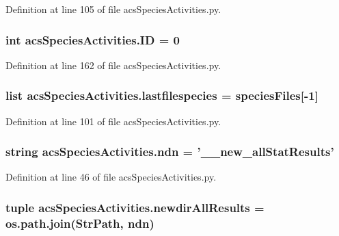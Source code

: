 Definition at line 105 of file acs\-Species\-Activities.\-py.

\hypertarget{a00103_a8102909ea2c113190493bd581f17ba18}{
\subsubsection[{I\-D}]{\setlength{\rightskip}{0pt plus 5cm}int acs\-Species\-Activities.\-I\-D = 0}}\label{a00103_a8102909ea2c113190493bd581f17ba18}


Definition at line 162 of file acs\-Species\-Activities.\-py.

\hypertarget{a00103_ac7070acb2aaeb8965c57e81b6308ddd5}{
\subsubsection[{lastfilespecies}]{\setlength{\rightskip}{0pt plus 5cm}list acs\-Species\-Activities.\-lastfilespecies = {\bf species\-Files}\mbox{[}-\/1\mbox{]}}}\label{a00103_ac7070acb2aaeb8965c57e81b6308ddd5}


Definition at line 101 of file acs\-Species\-Activities.\-py.

\hypertarget{a00103_ad2a87ed28d0f42525ce49c390f390298}{
\subsubsection[{ndn}]{\setlength{\rightskip}{0pt plus 5cm}string acs\-Species\-Activities.\-ndn = '\-\_\-\_\-new\-\_\-all\-Stat\-Results'}}\label{a00103_ad2a87ed28d0f42525ce49c390f390298}


Definition at line 46 of file acs\-Species\-Activities.\-py.

\hypertarget{a00103_a4fc28291b7f61ee2fa8969fa7a690ba2}{
\subsubsection[{newdir\-All\-Results}]{\setlength{\rightskip}{0pt plus 5cm}tuple acs\-Species\-Activities.\-newdir\-All\-Results = os.\-path.\-join({\bf Str\-Path}, {\bf ndn})}}\label{a00103_a4fc28291b7f61ee2fa8969fa7a690ba2}


